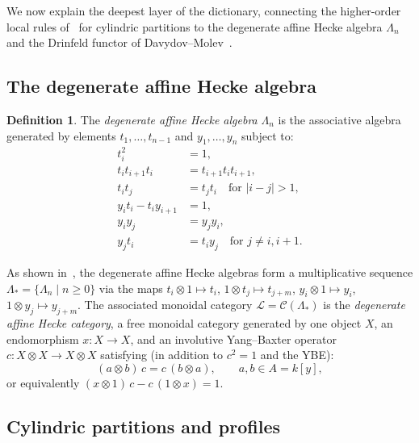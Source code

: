 \documentclass[12pt,a4paper]{article}
\theoremstyle{definition}
\newtheorem{definition}[theorem]{Definition}
\theoremstyle{remark}
\begin{document}
We now explain the deepest layer of the dictionary, connecting the
higher-order local rules of~\cite{Langer} for cylindric partitions to
the degenerate affine Hecke algebra $\Lambda_n$ and the Drinfeld
functor of Davydov--Molev~\cite{DM}.

\subsection{The degenerate affine Hecke algebra}

\begin{definition}
The \emph{degenerate affine Hecke algebra} $\Lambda_n$ is the
associative algebra generated by elements
$t_1, \ldots, t_{n-1}$ and $y_1, \ldots, y_n$ subject to:
\begin{align}
  t_i^2 &= 1, \label{eq:daha-inv}\\
  t_i t_{i+1} t_i &= t_{i+1} t_i t_{i+1}, \label{eq:daha-braid}\\
  t_i t_j &= t_j t_i \quad\text{for } |i-j|>1, \label{eq:daha-comm-t}\\
  y_i t_i - t_i y_{i+1} &= 1, \label{eq:daha-yt}\\
  y_i y_j &= y_j y_i, \label{eq:daha-comm-y}\\
  y_j t_i &= t_i y_j \quad\text{for } j \neq i, i{+}1.
    \label{eq:daha-comm-yt}
\end{align}
\end{definition}

As shown in~\cite{DM}, the degenerate affine Hecke algebras form a
multiplicative sequence $\Lambda_* = \{\Lambda_n \mid n \geqslant 0\}$
via the maps $t_i \otimes 1 \mapsto t_i$,
$1 \otimes t_j \mapsto t_{j+m}$, $y_i \otimes 1 \mapsto y_i$,
$1 \otimes y_j \mapsto y_{j+m}$. The associated monoidal category
$\mathcal{L} = \mathcal{C}(\Lambda_*)$ is the \emph{degenerate affine
Hecke category}, a free monoidal category generated by one object $X$,
an endomorphism $x : X \to X$, and an involutive Yang--Baxter operator
$c : X \otimes X \to X \otimes X$ satisfying (in addition to $c^2 = 1$
and the YBE):
\begin{equation}\label{eq:affine-rel}
  (a \otimes b)\, c = c\, (b \otimes a), \qquad a, b \in A = k[y],
\end{equation}
or equivalently $(x \otimes 1)\,c - c\,(1 \otimes x) = 1$.

\subsection{Cylindric partitions and profiles}
\end{document}
